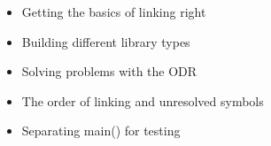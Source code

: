 \begin{itemize}
\item
Getting the basics of linking right

\item
Building different library types

\item
Solving problems with the ODR

\item
The order of linking and unresolved symbols

\item
Separating main() for testing
\end{itemize}











































